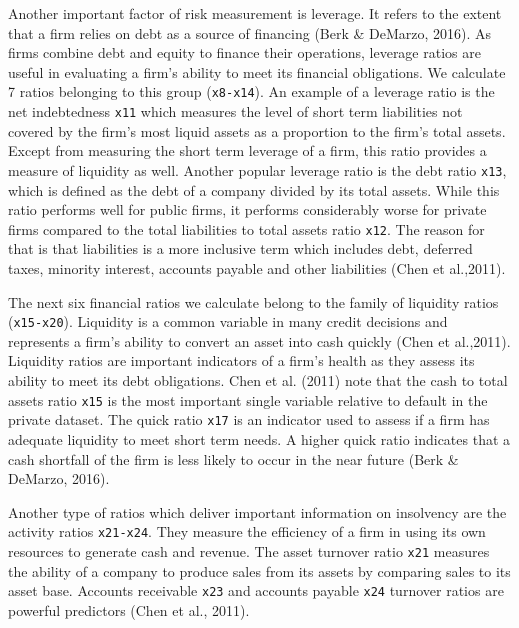 \documentclass{article}
\begin{document}


Another important factor of risk measurement is leverage. It refers to the extent that a firm relies on debt as a source of financing (Berk \& DeMarzo, 2016). As firms combine debt and equity to finance their operations, leverage ratios are useful in evaluating a firm's ability to meet its financial obligations. We calculate 7 ratios belonging to this group (\texttt{x8-x14}). An example of a leverage ratio is the net indebtedness \texttt{x11} which measures the level of short term liabilities not covered by the firm's most liquid assets as a proportion to the firm's total assets. Except from measuring the short term leverage of a firm, this ratio provides a measure of liquidity as well. Another popular leverage ratio is the debt ratio \texttt{x13}, which is defined as the debt of a company divided by its total assets. While this ratio performs well for public firms, it performs  considerably worse for private firms compared to the total liabilities to total assets ratio \texttt{x12}. The reason for that is that liabilities is a more inclusive term which includes debt, deferred taxes, minority interest, accounts payable and other liabilities (Chen et al.,2011).
 
 The next six financial ratios we calculate belong to the family of liquidity ratios (\texttt{x15-x20}). Liquidity is a common variable in many credit decisions and represents a firm's ability to convert an asset into cash quickly (Chen et al.,2011). Liquidity ratios are important indicators of a firm's health as they assess its ability to meet its debt obligations. Chen et al. (2011) note that the cash to total assets ratio \texttt{x15} is the most important single variable relative to default in the private dataset. The quick ratio \texttt{x17} is an indicator used to assess if a firm has adequate liquidity to meet short term needs. A higher quick ratio indicates that a cash shortfall of the firm is less likely to occur in the near future (Berk \& DeMarzo, 2016). 
 
 Another type of ratios which deliver important information on insolvency are the activity ratios \texttt{x21-x24}. They measure the efficiency of a firm in using its own resources to generate cash and revenue. The asset turnover ratio \texttt{x21} measures the ability of a company to produce sales from its assets by comparing sales to its asset base. Accounts receivable \texttt{x23} and accounts payable \texttt{x24} turnover ratios are powerful predictors (Chen et al., 2011).  
\end{document}
